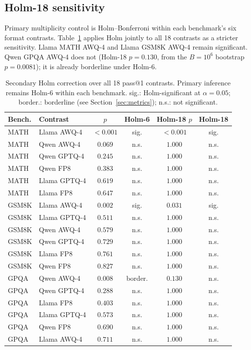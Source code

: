 \documentclass[11pt,a4paper]{article}
\begin{document}
\FloatBarrier
\subsection{Holm-18 sensitivity}
\label{app:holm18}
Primary multiplicity control is Holm--Bonferroni within each benchmark's six format contrasts. Table~\ref{tab:holm18} applies Holm jointly to all 18 contrasts as a stricter sensitivity. Llama MATH AWQ-4 and Llama GSM8K AWQ-4 remain significant. Qwen GPQA AWQ-4 does not (Holm-18 $p=0.130$, from the $B=10^6$ bootstrap $p=0.0081$); it is already borderline under Holm-6.

\begin{table}[!htbp]
\centering
\caption{Secondary Holm correction over all 18 pass@1 contrasts. Primary inference remains Holm-6 within each benchmark. sig.: Holm-significant at $\alpha=0.05$; border.: borderline (see Section~\ref{sec:metrics}); n.s.: not significant.}
\label{tab:holm18}
\small
\begin{tabular}{llcccc}
\toprule
\textbf{Bench.} & \textbf{Contrast} & $p$ & \textbf{Holm-6} & \textbf{Holm-18 $p$} & \textbf{Holm-18} \\
\midrule
MATH & Llama AWQ-4 & $<0.001$ & sig. & $<0.001$ & sig. \\
MATH & Qwen AWQ-4 & $0.069$ & n.s. & $1.000$ & n.s. \\
MATH & Qwen GPTQ-4 & $0.245$ & n.s. & $1.000$ & n.s. \\
MATH & Qwen FP8 & $0.383$ & n.s. & $1.000$ & n.s. \\
MATH & Llama GPTQ-4 & $0.619$ & n.s. & $1.000$ & n.s. \\
MATH & Llama FP8 & $0.647$ & n.s. & $1.000$ & n.s. \\
GSM8K & Llama AWQ-4 & $0.002$ & sig. & $0.031$ & sig. \\
GSM8K & Llama GPTQ-4 & $0.511$ & n.s. & $1.000$ & n.s. \\
GSM8K & Qwen AWQ-4 & $0.579$ & n.s. & $1.000$ & n.s. \\
GSM8K & Qwen GPTQ-4 & $0.729$ & n.s. & $1.000$ & n.s. \\
GSM8K & Llama FP8 & $0.761$ & n.s. & $1.000$ & n.s. \\
GSM8K & Qwen FP8 & $0.827$ & n.s. & $1.000$ & n.s. \\
GPQA & Qwen AWQ-4 & $0.008$ & border. & $0.130$ & n.s. \\
GPQA & Qwen GPTQ-4 & $0.288$ & n.s. & $1.000$ & n.s. \\
GPQA & Llama FP8 & $0.403$ & n.s. & $1.000$ & n.s. \\
GPQA & Llama GPTQ-4 & $0.573$ & n.s. & $1.000$ & n.s. \\
GPQA & Qwen FP8 & $0.690$ & n.s. & $1.000$ & n.s. \\
GPQA & Llama AWQ-4 & $0.711$ & n.s. & $1.000$ & n.s. \\
\bottomrule
\end{tabular}
\end{table}
\end{document}
